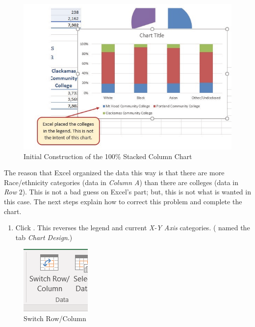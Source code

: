\begin{figure}[H]
	\centering
	\includegraphics[width=\maxwidth{.95\linewidth}]{gfx/ch04_fig25}
	\caption{Initial Construction of the 100\% Stacked Column Chart}
	\label{04:fig25}
\end{figure}

The reason that Excel organized the data this way is that there are more Race/ethnicity categories (data in \textit{Column A}) than there are colleges (data in \textit{Row }$ 2 $). This is not a bad guess on Excel's part; but, this is not what is wanted in this case. The next steps explain how to correct this problem and complete the chart.

\begin{enumerate}
	\item Click . This reverses the legend and current \textit{X-Y Axis} categories. ( named the tab \textit{Chart Design}.)
\end{enumerate}

\begin{figure}[H]
	\centering
	\includegraphics[width=\maxwidth{.95\linewidth}]{gfx/ch04_fig26}
	\caption{Switch Row/Column}
	\label{04:fig26}
\end{figure}

